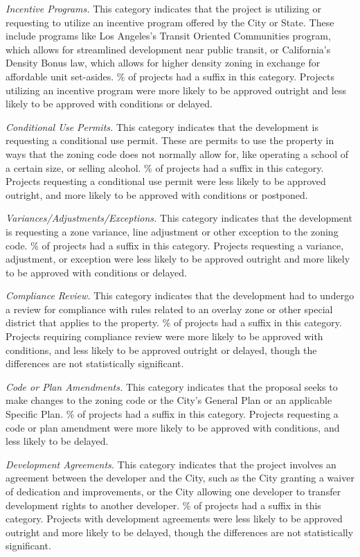 \emph{Incentive Programs.} This category indicates that the project is utilizing or requesting to utilize an incentive program offered by the City or State. These include programs like Los Angeles's Transit Oriented Communities program, which allows for streamlined development near public transit, or California's Density Bonus law, which allows for higher density zoning in exchange for affordable unit set-asides. \% of projects had a suffix in this category. Projects utilizing an incentive program were more likely to be approved outright and less likely to be approved with conditions or delayed.

\emph{Conditional Use Permits.} This category indicates that the development is requesting a conditional use permit. These are permits to use the property in ways that the zoning code does not normally allow for, like operating a school of a certain size, or selling alcohol.  \% of projects had a suffix in this category. Projects requesting a conditional use permit were less likely to be approved outright, and more likely to be approved with conditions or postponed.

\emph{Variances/Adjustments/Exceptions.} This category indicates that the development is requesting a zone variance, line adjustment or other exception to the zoning code. \% of projects had a suffix in this category. Projects requesting a variance, adjustment, or exception were less likely to be approved outright and more likely to be approved with conditions or delayed.

\emph{Compliance Review.} This category indicates that the development had to undergo a review for compliance with rules related to an overlay zone or other special district that applies to the property. \% of projects had a suffix in this category. Projects requiring compliance review were more likely to be approved with conditions, and less likely to be approved outright or delayed, though the differences are not statistically significant.

\emph{Code or Plan Amendments.} This category indicates that the proposal seeks to make changes to the zoning code or the City's General Plan or an applicable Specific Plan. \% of projects had a suffix in this category. Projects requesting a code or plan amendment were more likely to be approved with conditions, and less likely to be delayed.

\emph{Development Agreements.} This category indicates that the project involves an agreement between the developer and the City, such as the City granting a waiver of dedication and improvements, or the City allowing one developer to transfer development rights to another developer. \% of projects had a suffix in this category. Projects with development agreements were less likely to be approved outright and more likely to be delayed, though the differences are not statistically significant.


